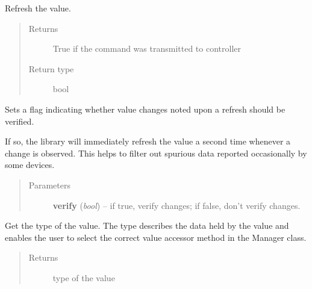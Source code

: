 \documentclass[letterpaper,10pt,english]{sphinxmanual}
\begin{document}
\begin{fulllineitems}
\begin{fulllineitems}
\end{fulllineitems}


\begin{fulllineitems}
\label{value:openzwave.value.ZWaveValue.refresh}
Refresh the value.
\begin{quote}\begin{description}
\item[{Returns}] \leavevmode
True if the command was transmitted to controller

\item[{Return type}] \leavevmode
bool

\end{description}\end{quote}

\end{fulllineitems}


\begin{fulllineitems}
\label{value:openzwave.value.ZWaveValue.set_change_verified}
Sets a flag indicating whether value changes noted upon a refresh should be verified.

If so, the library will immediately refresh the value a second time whenever a change is observed.
This helps to filter out spurious data reported occasionally by some devices.
\begin{quote}\begin{description}
\item[{Parameters}] \leavevmode
\textbf{verify} (\emph{bool}) -- if true, verify changes; if false, don't verify changes.

\end{description}\end{quote}

\end{fulllineitems}


\begin{fulllineitems}
\label{value:openzwave.value.ZWaveValue.type}
Get the type of the value.  The type describes the data held by the value
and enables the user to select the correct value accessor method in the
Manager class.
\begin{quote}\begin{description}
\item[{Returns}] \leavevmode
type of the value


\end{description}
\end{quote}
\end{fulllineitems}
\end{fulllineitems}
\end{document}
